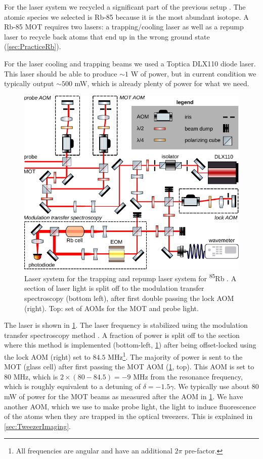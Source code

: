 For the laser system we recycled a significant part of the previous setup \cite{Reijnders2010}.
The atomic species we selected is Rb-85 because it is the most abundant isotope. 
A Rb-85 MOT requires two lasers: a trapping/cooling laser as well as a repump laser to recycle back atoms that end up in the wrong ground state (\cref{sec:PracticeRb}).

For the laser cooling and trapping beams we used a Toptica DLX110 diode laser. This laser should be able to produce $\sim 1$ W of power, but in current condition we typically output $\sim 500$ mW, which is already plenty of power for what we need. 
\begin{figure}[t]
    \centering
    \includegraphics[width=\linewidth]{figures/RbLaserSetup.pdf}
    \caption{Laser system for the trapping and repump laser system for \textsuperscript{85}Rb \cite{Reijnders2010}.
    A section of laser light is split off to the modulation transfer spectroscopy (bottom left), after first double passing the lock \ac{AOM} (right). 
    Top: set of AOMs for the MOT and probe light.
    }
    \label{fig:RbLaserSetup}
\end{figure}
The laser is shown in \cref{fig:RbLaserSetup}.
The laser frequency is stabilized using the modulation transfer spectroscopy method \cite{Reijnders2010,McCarron2008}.
A fraction of power is split off to the section where this method is implemented  (bottom-left, \cref{fig:RbLaserSetup}) after being offset-locked using the lock \acf{AOM} (right) set to $84.5$ MHz\footnote{All frequencies are angular and have an additional $2\pi$ pre-factor.}.
The majority of power is sent to the MOT (glass cell) after first passing the MOT AOM (\cref{fig:RbLaserSetup}, top).
This AOM is set to 80 MHz, which is $2 \times (80 - 84.5) = -9$ MHz from the resonance frequency, which is roughly equivalent to a detuning of $\delta = -1.5 \gamma$.
We typically use about $80$ mW of power for the MOT beams as measured after the \ac{AOM} in \cref{fig:RbLaserSetup}.
We have another AOM, which we use to make probe light, the light to induce fluorescence of the atoms when they are trapped in the optical tweezers.
This is explained in \cref{sec:TweezerImaging}.

